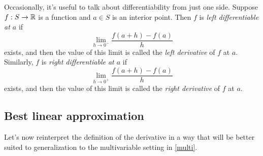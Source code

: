 \begin{unimportantremark}
	Occasionally, it's useful to talk about differentiability from just one side. Suppose $f : S \to \mathbb{R}$ is a function and $a \in S$ is an interior point. Then $f$ is \emph{left differentiable at $a$} if 
	\[ \lim_{h \to 0^-} \frac{f(a+h)-f(a)}{h} \]
	exists, and then the value of this limit is called the \emph{left derivative} of $f$ at $a$. Similarly, $f$ is \emph{right differentiable at $a$} if 
	\[ \lim_{h \to 0^+} \frac{f(a+h)-f(a)}{h} \]
	exists, and then the value of this limit is called the \emph{right derivative} of $f$ at $a$.
\end{unimportantremark}

\subsection{Best linear approximation}

Let's now reinterpret the definition of the derivative in a way that will be better suited to generalization to the multivariable setting in \cref{multi}. 

